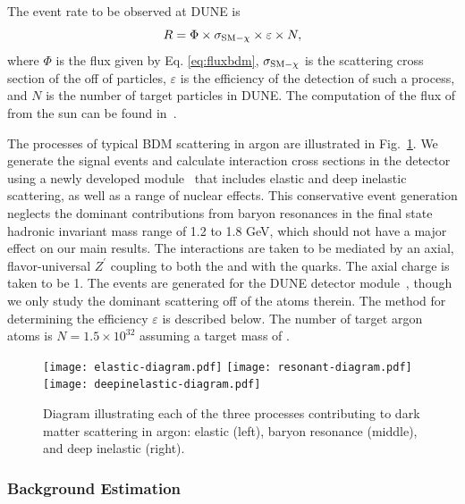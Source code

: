 The event rate to be observed at DUNE is 
\begin{equation}
R = \Phi \times \sigma_{\rm{SM} - \chi} \times \varepsilon \times N,
\end{equation}
 where $\Phi$ is the flux given by Eq. \eqref{eq:fluxbdm}, $\sigma_{\rm{SM} - \chi}$ is the scattering cross section of the  off of  particles, $\varepsilon$ is the efficiency of the detection of such a process, and $N$ is the number of target particles in DUNE. The computation of the flux of  from the sun can be found in~\cite{Berger:2014sqa}. 

The processes of typical BDM scattering in argon are illustrated in Fig.~\ref{fig:BDM-argon}.
We generate the signal events and calculate interaction cross sections in the detector using a newly developed  module~\cite{Andreopoulos:2009rq,Andreopoulos:2015wxa,Berger:2018} that includes elastic and deep inelastic scattering, as well as a range of nuclear effects. This conservative event generation neglects the dominant contributions from baryon resonances in the final state hadronic invariant mass range of 1.2 to 1.8 GeV, which should not have a major effect on our main results. The interactions are taken to be mediated by an axial, flavor-universal $Z^\prime$ coupling to both the  and with the quarks. The axial charge is taken to be 1. 
The events are generated for the \nominalmodsize DUNE detector module~\cite{dunetpc_code}, though we only study the dominant scattering off of the  atoms therein. The method for determining the efficiency $\varepsilon$ is described below. The number of target argon atoms is $N = 1.5  \times 10^{32}$ assuming a target mass of \nominalmodsize{}.

\begin{figure}[h!]
  \centering
  \texttt{[image: elastic-diagram.pdf]}
  \texttt{[image: resonant-diagram.pdf]}
  \texttt{[image: deepinelastic-diagram.pdf]}
  \caption{Diagram illustrating each of the three processes contributing to dark matter scattering in argon: elastic (left), baryon resonance (middle), and deep inelastic (right).}
  \label{fig:BDM-argon}
\end{figure}
\subsubsection{Background Estimation}
\label{sec:background}

